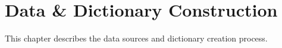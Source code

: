 
\chapter{Data \& Dictionary Construction}

This chapter describes the data sources and dictionary creation process.

